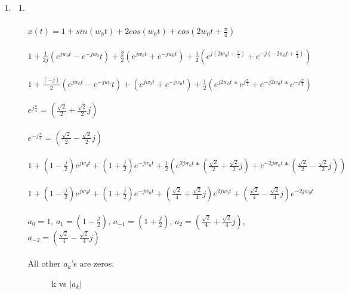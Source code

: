 \documentclass[10pt,a4paper, margin=1in]{article}
\begin{document}
\begin{enumerate}
\item %
    \begin{enumerate}   
    \item %
        \\\\ $x(t) = 1 + sin(w_{0}t) + 2cos(w_{0}t) + cos(2w_{0}t + \frac{\pi}{4})$
        \\\\ $1 + \frac{1}{2j}(e^{jw_{0}t} - e^{-jw_{0}}t) + \frac{2}{2}(e^{jw_{0}t} + e^{-jw_{0}t}) + \frac{1}{2}(e^{j(2w_{0}t + \frac{\pi}{4})} + e^{-j(-2w_{0}t+\frac{\pi}{4})})$
        \\\\ $1 + \frac{(-j)}{2}(e^{jw_{0}t} - e^{-jw_{0}}t) + (e^{jw_{0}t} + e^{-jw_{0}t}) + \frac{1}{2}(e^{j2w_{0}t} * e^{j\frac{\pi}{4}} + e^{-j2w_{0}t} * e^{-j\frac{\pi}{4}})$
        \\\\ $e^{j\frac{\pi}{4}} = (\frac{\sqrt{2}}{2} +\frac{\sqrt{2}}{2}j)$
        \\\\ $e^{-j\frac{\pi}{4}} = (\frac{\sqrt{2}}{2} -\frac{\sqrt{2}}{2}j)$
        \\\\ $1+(1-\frac{j}{2})e^{jw_{0}t} + (1+\frac{j}{2})e^{-jw_{0}t} + \frac{1}{2}(e^{2jw_{0}t} * (\frac{\sqrt{2}}{2} +\frac{\sqrt{2}}{2}j ) + e^{-2jw_{0}t} * (\frac{\sqrt{2}}{2} -\frac{\sqrt{2}}{2}j ))$
        \\\\ $1+(1-\frac{j}{2})e^{jw_{0}t} + (1+\frac{j}{2})e^{-jw_{0}t} + (\frac{\sqrt{2}}{4} +\frac{\sqrt{2}}{4}j )e^{2jw_{0}t}  + (\frac{\sqrt{2}}{4} -\frac{\sqrt{2}}{4}j )e^{-2jw_{0}t} $
        \\\\ $a_{0} = 1$, $a_{1} = (1-\frac{j}{2})$, $a_{-1} = (1+\frac{j}{2})$, $a_{2} = (\frac{\sqrt{2}}{4} +\frac{\sqrt{2}}{4}j)$, $a_{-2} = (\frac{\sqrt{2}}{4} -\frac{\sqrt{2}}{4}j)$
        \\\\ All other $a_{k}$'s are zeros.
        \begin{figure} [H]
            \centering
            \caption{k vs $|a_k|$}
            \label{fig:q4a_1}
        \end{figure}
        

\end{enumerate}
\end{enumerate}
\end{document}

